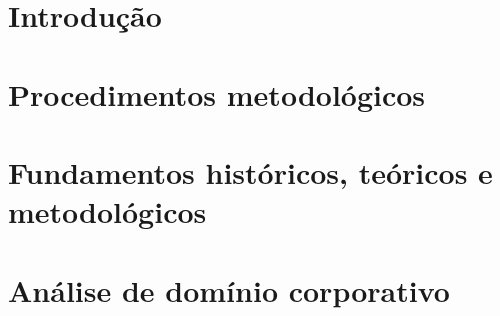 \documentclass[
	11pt,				%
	openright,			%
	oneside,			%
	a4paper,			%
	english,			%
	french,				%
	spanish,			%
	brazil,				%
	]{abntex2}
\begin{document}
\listoftables*
\cleardoublepage



\tableofcontents*
\cleardoublepage



\textual

\chapter[Introdução]{Introdução}


\chapter{Procedimentos metodológicos}


\chapter{Fundamentos históricos, teóricos e metodológicos}


\chapter{Análise de domínio corporativo}
\label{analiseDominio}

\end{document}
